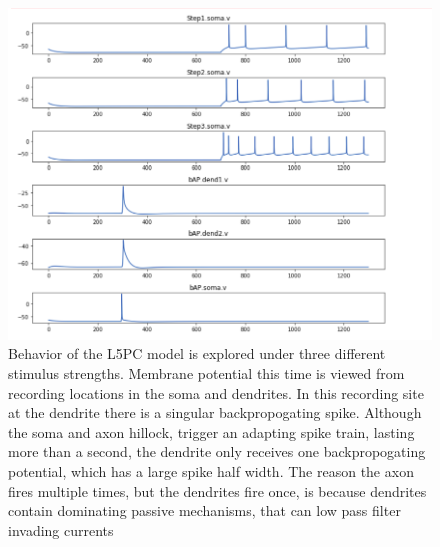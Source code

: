 \begin{figure}
    \begin{center}
    \includegraphics{figures/l5pc_before_opt}
    \caption[Behavior of the L5PC model before optimization under default parameters]{Behavior of the L5PC model is explored under three different stimulus strengths. Membrane potential this time is viewed from recording locations in the soma and dendrites. In this recording site at the dendrite there is a singular backpropogating spike. Although the soma and axon hillock, trigger an adapting spike train, lasting more than a second, the dendrite only receives one backpropogating potential, which has a large spike half width. The reason the axon fires multiple times, but the dendrites fire once, is because  dendrites contain dominating passive mechanisms, that can low pass filter invading currents}
    \label{fig:my_label}
    \end{center}
\end{figure}

